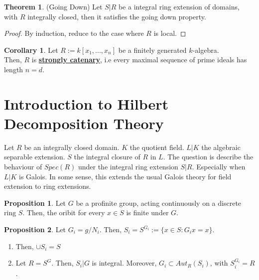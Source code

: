 \documentclass{article}
\theoremstyle{definition}
\newtheorem{theorem}{Theorem}[section]
\theoremstyle{definition}
\theoremstyle{definition}
\newtheorem{proposition}{Proposition}[section]
\theoremstyle{definition}
\theoremstyle{definition}
\theoremstyle{definition}
\newtheorem{corollary}{Corollary}[theorem]
\theoremstyle{definition}
\begin{document}
\begin{tcolorbox}[colback=red!5!white,colframe=red!30!white]
\begin{theorem}
(Going Down) Let $S|R$ be a integral ring extension of domains, with $R$ integrally closed, then it satisfies the going down property.
\end{theorem}
\end{tcolorbox}
\begin{proof}
    By induction, reduce to the case where $R$ is local. 
\end{proof}

\begin{tcolorbox}[colback=green!5!white,colframe=green!30!white]
    \begin{corollary}
        Let $R:=k[x_1,...,x_n]$ be a finitely generated $k$-algebra. \\
        Then, $R$ is \underline{\textbf{strongly catenary}}, i.e every maximal sequence of prime ideals has length $n=d$. 
    \end{corollary}
    \end{tcolorbox}

\section{Introduction to Hilbert Decomposition Theory}
Let $R$ be an integrally closed domain. $K$ the quotient field. $L|K$ the algebraic separable extension. $S$ the integral closure of $R$ in $L$. The question is describe the behaviour of $Spec(R)$ under the integral ring extension $S|R$. Especially when $L|K$ is Galois. In some sense, this extends the usual Galois theory for field extension to ring extensions. 


\begin{tcolorbox}[colback=blue!5!white,colframe=blue!30!white]
\begin{proposition}
    Let $G$ be a profinite group, acting continuously on a discrete ring $S$.  Then, the oribit for every $x\in S$ is finite under $G$. 
\end{proposition}
\end{tcolorbox}


\begin{tcolorbox}[colback=blue!5!white,colframe=blue!30!white]
\begin{proposition}
Let $G_i=g/N_i$. Then, $S_i=S^{G_i}:= \{ x\in S: G_ix=x \}$. 
\begin{enumerate}
    \item Then, $\cup S_i=S$
\item Let $R=S^G$. Then, $S_i|G$ is integral. Moreover, $G_i\subset Aut_R(S_i)$, with $S_i^{G_i}=R$.
\end{enumerate}
\end{proposition}
\end{tcolorbox}
\end{document}
